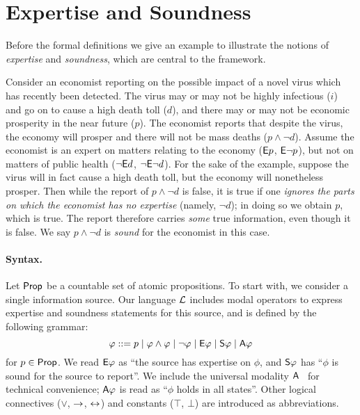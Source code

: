 \section{Expertise and Soundness}
\label{exp_sec_expertise_and_soundness}

Before the formal definitions we give an example to illustrate the notions of
\emph{expertise} and \emph{soundness}, which are central to the framework.

\begin{example}
    \label{exp_ex_economist_motivation}

    Consider an economist reporting on the possible impact of a novel virus
    which has recently been detected. The virus may or may not be highly
    infectious ($i$) and go on to cause a high death toll ($d$), and there may
    or may not be economic prosperity in the near future ($p$). The economist
    reports that despite the virus, the economy will prosper and there will not
    be mass deaths ($p \land \neg d$). Assume the economist is an expert on
    matters relating to the economy ($\E p$, $\E\neg p$), but not on matters of
    public health ($\neg\E d$, $\neg\E\neg d$). For the sake of the example,
    suppose the virus will in fact cause a high death toll, but the economy
    will nonetheless prosper. Then while the report of $p \land \neg d$ is
    false, it is true if one \emph{ignores the parts on which the economist has
    no expertise} (namely, $\neg d$); in doing so we obtain $p$, which is true.
    The report therefore carries \emph{some} true information, even though it
    is false. We say $p \land \neg d$ is \emph{sound} for the economist in this
    case.

\end{example}

\paragraph{Syntax.}

Let $\Prop$ be a countable set of atomic propositions.
%
To start with, we consider a single information source. Our language $\cL$
includes modal operators to express expertise and soundness statements for this
source, and is defined by the following grammar:
\[
\phi ::=
 p \mid
 \phi \land \phi \mid
 \neg\phi \mid
 \E\phi \mid
 \S\phi \mid
 \A\phi
\]
for $p \in \Prop$. We read $\E\phi$ as ``the source has expertise on
$\phi$, and $\S\phi$ has ``$\phi$ is sound for the source to
report''. We include the universal modality $\A$~\cite{goranko_1992}
for technical convenience; $\A\phi$ is read as ``$\phi$ holds in all
states''.  Other logical connectives ($\lor$, $\limplies$,
$\liff$) and constants ($\top$, $\bot$) are introduced as
abbreviations.

